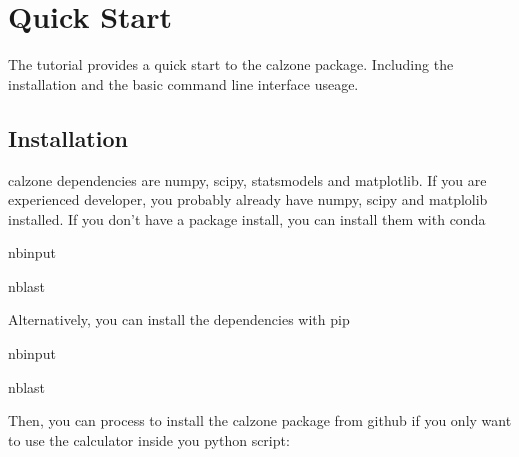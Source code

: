 \documentclass[letterpaper,10pt,english]{sphinxmanual}
\begin{document}
\sphinxstepscope


\chapter{Quick Start}
\label{\detokenize{notebooks/quickstart:Quick-Start}}\label{\detokenize{notebooks/quickstart::doc}}
\sphinxAtStartPar
The tutorial provides a quick start to the calzone package. Including the installation and the basic command line interface useage.


\section{Installation}
\label{\detokenize{notebooks/quickstart:Installation}}
\sphinxAtStartPar
calzone dependencies are numpy, scipy, statsmodels and matplotlib. If you are experienced developer, you probably already have numpy, scipy and matplolib installed. If you don’t have a package install, you can install them with conda

\begin{sphinxuseclass}{nbinput}
\begin{sphinxuseclass}{nblast}
{
\begin{sphinxVerbatim}[commandchars=\\\{\}]
\llap{\color{nbsphinxin}[ ]:\,\hspace{\fboxrule}\hspace{\fboxsep}}  
  
  
  
\end{sphinxVerbatim}
}

\end{sphinxuseclass}
\end{sphinxuseclass}
\sphinxAtStartPar
Alternatively, you can install the dependencies with pip

\begin{sphinxuseclass}{nbinput}
\begin{sphinxuseclass}{nblast}
{
\begin{sphinxVerbatim}[commandchars=\\\{\}]
\llap{\color{nbsphinxin}[ ]:\,\hspace{\fboxrule}\hspace{\fboxsep}}  
  
  
  
\end{sphinxVerbatim}
}

\end{sphinxuseclass}
\end{sphinxuseclass}
\sphinxAtStartPar
Then, you can process to install the calzone package from github if you only want to use the calculator inside you python script:
\end{document}
